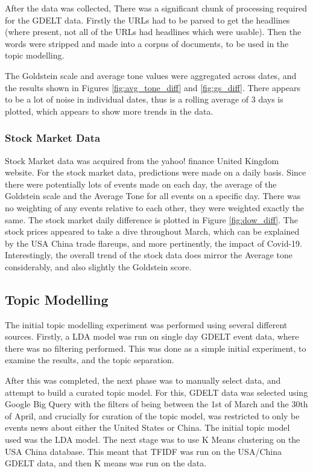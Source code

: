 After the data was collected, There was a significant chunk of processing required for the GDELT data. Firstly the URLs had to be parsed to get the headlines (where present, not all of the URLs had headlines which were usable). Then the words were stripped and made into a corpus of documents, to be used in the topic modelling. 

The Goldstein scale and average tone values were aggregated across dates, and the results shown in Figures \ref{fig:avg_tone_diff} and \ref{fig:gs_diff}. There appears to be a lot of noise in individual dates, thus is a rolling average of 3 days is plotted, which appears to show more trends in the data. 

 
\subsubsection{Stock Market Data}
Stock Market data was acquired from the yahoo! finance United Kingdom website. For the stock market data, predictions were made on a daily basis. Since there were potentially lots of events made on each day, the average of the Goldstein scale and the Average Tone for all events on a specific day. There was no weighting of any events relative to each other, they were weighted exactly the same. The stock market daily difference is plotted in Figure \ref{fig:dow_diff}. The stock prices appeared to take a dive throughout March, which can be explained by the USA China trade flareups, and more pertinently, the impact of Covid-19. Interestingly, the overall trend of the stock data does mirror the Average tone considerably, and also slightly the Goldstein score. 

\subsection{Topic Modelling}

The initial topic modelling experiment was performed using several different sources. Firstly, a LDA model was run on single day GDELT event data, where there was no filtering performed. This was done as a simple initial experiment, to examine the results, and the topic separation. 

After this was completed, the next phase was to manually select data, and attempt to build a curated topic model. For this, GDELT data was selected using Google Big Query with the filters of being between the 1st of March and the 30th of April, and crucially for curation of the topic model, was restricted to only be events news about either the United States or China. The initial topic model used was the LDA model. The next stage was to use K Means clustering on  the USA China database. This meant that TFIDF was run on the USA/China GDELT data, and then K means was run on the data.

